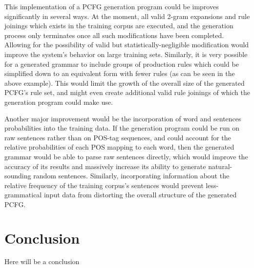 \documentclass[paper=a4, fontsize=11pt]{scrartcl} %
\numberwithin{equation}{section} %
\numberwithin{figure}{section} %
\numberwithin{table}{section} %
\begin{document}
This implementation of a PCFG generation program could be improves significantly in several ways. At the moment, all valid 2-gram expansions and rule joinings which exists in the training corpus are executed, and the generation process only terminates once all such modifications have been completed. Allowing for the possibility of valid but statistically-negligible modification would improve the system's behavior on large training sets. Similarly, it is very possible for a generated grammar to include groups of production rules which could be simplified down to an equivalent form with fewer rules (as can be seen in the above example). This would limit the growth of the overall size of the generated PCFG's rule set, and might even create additional valid rule joinings of which the generation program could make use.

Another major improvement would be the incorporation of word and sentences probabilities into the training data. If the generation program could be run on raw sentences rather than on POS-tag sequences, and could account for the relative probabilities of each POS mapping to each word, then the generated grammar would be able to parse raw sentences directly, which would improve the accuracy of its results and massively increase its ability to generate natural-sounding random sentences. Similarly, incorporating information about the relative frequency of the training corpus's sentences would prevent less-grammatical input data from distorting the overall structure of the generated PCFG.

\section{Conclusion}

Here will be a conclusion
\end{document}
